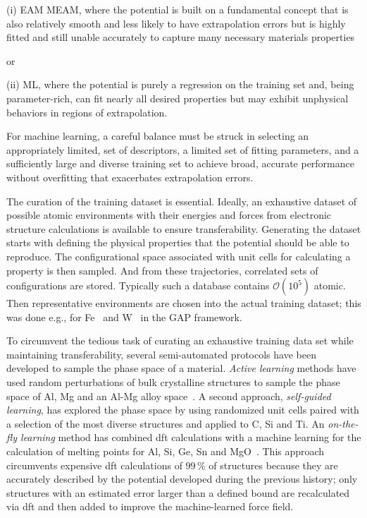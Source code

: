 \documentclass{article}
\begin{document}
(i) EAM MEAM, where the potential is built on a fundamental concept that is also relatively smooth and less likely to have extrapolation errors but is highly fitted and still unable accurately to capture many necessary materials properties 

or

(ii) ML, where the potential is purely a regression on the training set and, being parameter-rich, can fit nearly all desired properties but may exhibit unphysical behaviors in regions of extrapolation.

For machine learning, a careful balance must be struck in selecting an appropriately limited, set of descriptors, a limited set of fitting parameters, and a sufficiently large and diverse training set to achieve broad, accurate performance without overfitting that exacerbates extrapolation errors. 

The curation of the training dataset is essential.
Ideally, an exhaustive dataset of possible atomic environments with their energies and forces from electronic structure calculations is available to ensure transferability.
Generating the dataset starts with defining the physical properties that the potential should be able to reproduce. 
The configurational space associated with unit cells for calculating a property is then sampled.
And from these trajectories, correlated sets of configurations are stored.
Typically such a database contains $\mathcal{O}\left(10^5\right)$ atomic.
Then representative environments are chosen into the actual training dataset; this was done e.g., for Fe~\cite{Dragoni2018AchievingIron} and W~\cite{Szlachta2014AccuracyTungsten} in the GAP framework.

To circumvent the tedious task of curating an exhaustive training data set while maintaining transferability, several semi-automated protocols have been developed to sample the phase space of a material.
\textit{Active learning} methods have used random perturbations of bulk crystalline structures to sample the phase space of Al, Mg and an Al-Mg alloy space~\cite{Zhang2019ActiveSimulation}.
A second approach, \textit{self-guided learning}, has explored the phase space by using randomized unit cells paired with a selection of the most diverse structures and applied to C, Si and Ti.
An \textit{on-the-fly learning} method has combined dft calculations with a machine learning for the calculation of melting points for Al, Si, Ge, Sn and MgO~\cite{Jinnouchi2019On-the-flyPointsb}.
This approach circumvents expensive dft calculations of $99\,$\% of structures because they are accurately described by the potential developed during the previous history; only structures with an estimated error larger than a defined bound are recalculated via dft and then added to improve the machine-learned force field.
\end{document}

